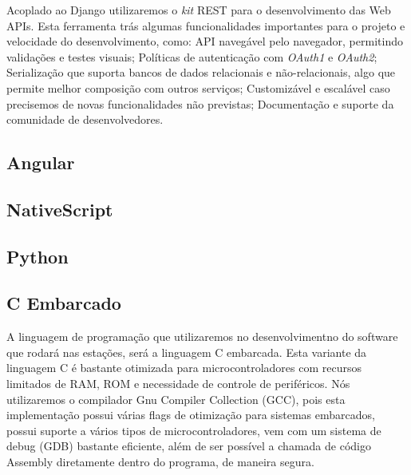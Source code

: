 		Acoplado ao Django utilizaremos o \textit{kit} REST para o desenvolvimento das Web APIs. Esta ferramenta trás algumas funcionalidades importantes para o projeto e velocidade do desenvolvimento, como: API navegável pelo navegador, permitindo validações e testes visuais; Políticas de autenticação com \textit{OAuth1} e \textit{OAuth2}; Serialização que suporta bancos de dados relacionais e não-relacionais, algo que permite melhor composição com outros serviços; Customizável e escalável caso precisemos de novas funcionalidades não previstas; Documentação e suporte da comunidade de desenvolvedores.

	\subsection{Angular}

	\subsection{NativeScript}

	\subsection{Python}

    \subsection{C Embarcado}
    A linguagem de programação que utilizaremos no desenvolvimentno do software que rodará
    nas estações, será a linguagem C embarcada. Esta variante da linguagem C é bastante otimizada
    para microcontroladores com recursos limitados de RAM, ROM e necessidade de controle de periféricos.
    Nós utilizaremos o compilador Gnu Compiler Collection (GCC), pois esta implementação possui várias flags
    de otimização para sistemas embarcados, possui suporte a vários tipos de microcontroladores, vem com
    um sistema de debug (GDB) bastante eficiente, além de ser possível a chamada de código Assembly diretamente
    dentro do programa, de maneira segura.